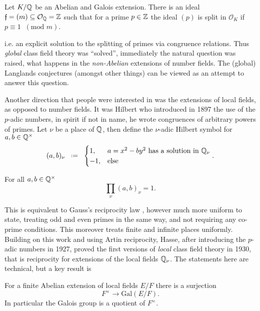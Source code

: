\begin{Theorem}\label{thm:reciprocity}
	Let \(K/\Q\) be an Abelian and Galois extension. There is an ideal \(\mathfrak{f} = (m)\subseteq \mathcal{O}_\Q = \Z\) such that for a prime \(p\in \Z\) the ideal \((p)\) is split in \(\mathcal{O}_K\) if \(p\equiv 1 \;\; (\text{mod }m)\).
\end{Theorem} 
i.e. an explicit solution to the splitting of primes via congruence relations. Thus \textit{global} class field theory was ``solved'', immediately the natural question was raised, what happens in the \textit{non-Abelian} extensions of number fields. The (global) Langlands conjectures (amongst other things) can be viewed as an attempt to answer this question. 

Another direction that people were interested in was the extensions of local fields, as opposed to number fields. It was Hilbert who introduced in 1897 the use of the \(p\)-adic numbers, in spirit if not in name, he wrote congruences of arbitrary powers of primes. Let \(\nu\) be a place of \(\Q\), then define the \(\nu\)-adic Hilbert symbol for \(a,b\in \Q^\times\)
\[(a,b)_\nu \defeq \begin{cases}
	1, & a= x^2-by^2 \text{ has a solution in }\Q_\nu\\
	-1, &\text{else}
\end{cases} .\]
\begin{Theorem}
	For all \(	a,b\in \Q^\times\) 
	\[\prod_\nu (a,b)_\nu = 1.\]
\end{Theorem}
This is equivalent to Gauss's reciprocity law%
, however much more uniform to state, treating odd and even primes in the same way, and not requiring any co-prime conditions. This moreover treats finite and infinite places uniformly. Building on this work and using Artin reciprocity, Hasse, after introducing the \(p\)-adic numbers in 1927, proved the first versions of \textit{local} class field theory in 1930, that is reciprocity for extensions of the local fields \(\Q_\nu\). The statements here are technical, but a key result is
\begin{Theorem}
	For a finite Abelian extension of local fields \(E/F\) there is a surjection 
	\[F^\times \to \mathrm{Gal}(E/F).\]
	In particular the Galois group is a quotient of \(F^\times\).
\end{Theorem}

